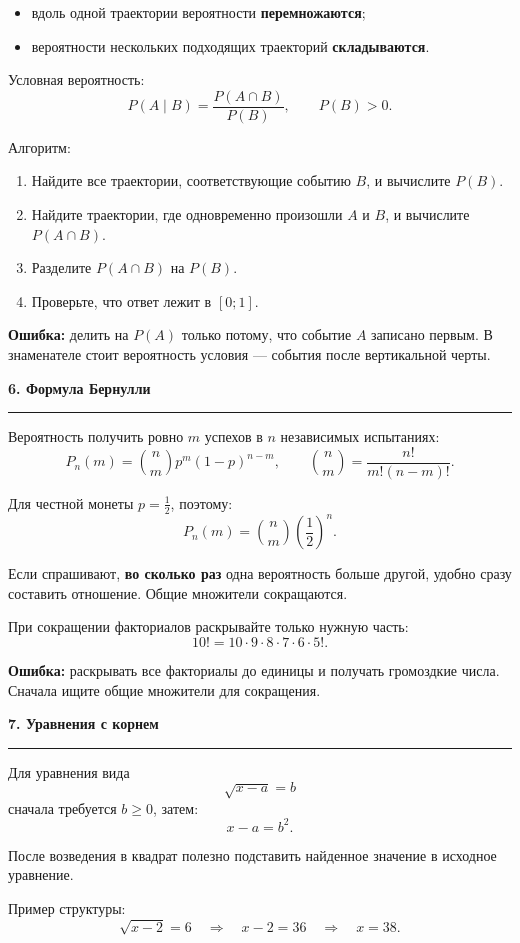 \documentclass[a4paper,12pt]{article}
\newcommand{\topic}[1]{%
  \Needspace{8\baselineskip}%
  \vspace{0.6em}
  {\Large\bfseries\color{darkaccent}#1}\par
  \vspace{0.25em}
  {\color{accent}\rule{\linewidth}{0.6pt}}\par
  \vspace{0.3em}
}
\newcommand{\key}[1]{\textbf{\color{darkaccent}#1}}
\newcommand{\mistake}[1]{\textbf{\color{warn}Ошибка:} #1}
\begin{document}
\begin{itemize}
  \item вдоль одной траектории вероятности \key{перемножаются};
  \item вероятности нескольких подходящих траекторий \key{складываются}.
\end{itemize}

Условная вероятность:
\[
P(A\mid B)=\frac{P(A\cap B)}{P(B)},\qquad P(B)>0.
\]

Алгоритм:
\begin{enumerate}
  \item Найдите все траектории, соответствующие событию \(B\), и вычислите \(P(B)\).
  \item Найдите траектории, где одновременно произошли \(A\) и \(B\), и вычислите \(P(A\cap B)\).
  \item Разделите \(P(A\cap B)\) на \(P(B)\).
  \item Проверьте, что ответ лежит в \([0;1]\).
\end{enumerate}

\mistake{делить на \(P(A)\) только потому, что событие \(A\) записано первым. В знаменателе стоит вероятность условия --- события после вертикальной черты.}

\topic{6. Формула Бернулли}

Вероятность получить ровно \(m\) успехов в \(n\) независимых испытаниях:
\[
P_n(m)=\binom{n}{m}p^m(1-p)^{n-m},
\qquad
\binom{n}{m}=\frac{n!}{m!(n-m)!}.
\]

Для честной монеты \(p=\frac12\), поэтому:
\[
P_n(m)=\binom{n}{m}\left(\frac12\right)^n.
\]

Если спрашивают, \key{во сколько раз} одна вероятность больше другой, удобно сразу составить отношение. Общие множители сокращаются.

При сокращении факториалов раскрывайте только нужную часть:
\[
10!=10\cdot9\cdot8\cdot7\cdot6\cdot5!.
\]

\mistake{раскрывать все факториалы до единицы и получать громоздкие числа. Сначала ищите общие множители для сокращения.}

\clearpage

\topic{7. Уравнения с корнем}

Для уравнения вида
\[
\sqrt{x-a}=b
\]
сначала требуется \(b\ge0\), затем:
\[
x-a=b^2.
\]

После возведения в квадрат полезно подставить найденное значение в исходное уравнение.

Пример структуры:
\[
\sqrt{x-2}=6
\quad\Longrightarrow\quad
x-2=36
\quad\Longrightarrow\quad
x=38.
\]
\end{document}
